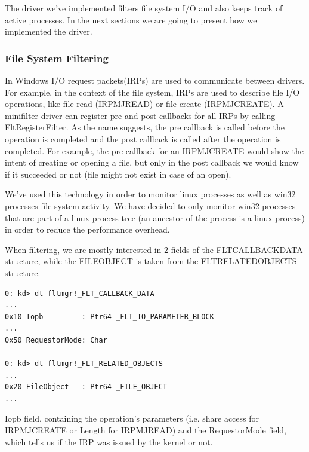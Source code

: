 \documentclass[conference]{IEEEtran}
\begin{document}
    \par{}
    The driver we've implemented filters file system I/O and also keeps track of active processes. In the next sections we are going to present
    how we implemented the driver.\\
    
    \subsubsection{File System Filtering}
    In Windows I/O request packets(IRPs) are used to communicate between drivers. For example, in the context of the file system, IRPs are used
    to describe file I/O operations, like file read (IRP\textunderscore MJ\textunderscore READ) or file create
    (IRP\textunderscore MJ\textunderscore CREATE). A minifilter driver can register pre and post callbacks for all IRPs by
    calling FltRegisterFilter. As the name suggests, the pre callback is called before the operation is completed and the post callback is
    called after the operation is completed. For example, the pre callback for an IRP\textunderscore MJ\textunderscore CREATE would show the intent
    of creating or opening a file, but only in the post callback we would know if it succeeded or not (file might not exist in case of an open).\\

    \par{}
    We've used this technology in order to monitor linux processes as well as win32 processes file system activity. We have decided to only monitor
    win32 processes that are part of a linux process tree (an ancestor of the process is a linux process) in order to reduce the performance
    overhead.

    \par{}
    When filtering, we are mostly interested in 2 fields of the FLT\textunderscore CALLBACK\textunderscore DATA structure, while the
    FILE\textunderscore OBJECT is taken from the FLT\textunderscore RELATED\textunderscore OBJECTS structure.\\

    \begin{verbatim}
0: kd> dt fltmgr!_FLT_CALLBACK_DATA
...
0x10 Iopb         : Ptr64 _FLT_IO_PARAMETER_BLOCK
...
0x50 RequestorMode: Char

0: kd> dt fltmgr!_FLT_RELATED_OBJECTS
...
0x20 FileObject   : Ptr64 _FILE_OBJECT
...

    \end{verbatim}
    Iopb field, containing the operation's parameters (i.e. share access for IRP\textunderscore MJ\textunderscore CREATE or Length for
    IRP\textunderscore MJ\textunderscore READ) and the RequestorMode field, which tells us if the IRP was issued by the kernel or not.\\
\end{document}
